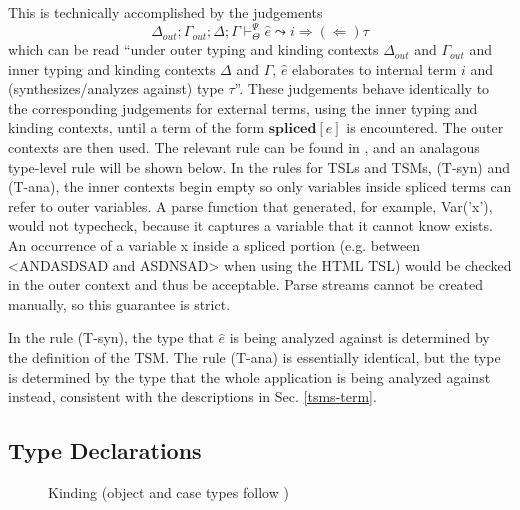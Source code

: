\documentclass{sig-alternate}[10pt]
\makeatletter
\newcommand\BeraMonottfamily{%
  \def\fvm@Scale{0.85}%
  \fontfamily{fvm}\selectfont%
}
\newcommand{\flyingbox}[1]{\fbox{{#1}}}
\newcommand{\mycaption}[1]{\vspace{-5px}\caption{#1}\vspace{-5px}}
\newcommand{\lstinlinew}[1]{{\scriptsize\BeraMonottfamily #1}}
\makeatother
\begin{document}
This is technically accomplished by the judgements \[\Delta_{out}; \Gamma_{out}; \Delta; \Gamma \vdash_{\Theta}^{\Psi} \hat{e} \leadsto i {\Rightarrow}{(\Leftarrow)} \tau\]  which can be read ``under outer typing and kinding contexts $\Delta_{out}$ and $\Gamma_{out}$ and inner typing and kinding contexts $\Delta$ and $\Gamma$,  $\hat{e}$ elaborates to internal term $i$ and (synthesizes/analyzes against) type $\tau$''. These judgements behave identically to the corresponding judgements for external terms, using the inner typing and kinding contexts, until a term of the form $\textbf{spliced}[e]$ is encountered. The outer contexts are then used. The relevant rule can be found in \cite{TSLs}, and an analagous type-level rule will be shown below. 
In the rules for TSLs and TSMs, (T-syn) and (T-ana), the inner contexts begin empty so only variables inside spliced terms can refer to outer variables. A \lstinlinew{parse} function that generated, for example, \lstinlinew{Var('x')}, would not typecheck, because it captures a variable that it cannot know exists. An occurrence of a variable \lstinlinew{x} inside a spliced portion (e.g. between \lstinlinew{<ANDASDSAD} and \lstinlinew{ASDNSAD>} when using the \lstinlinew{HTML} TSL) would be checked in the outer context and thus be acceptable. Parse streams cannot be created manually, so this guarantee is strict. %

In the rule (T-syn), the type that $\hat{e}$ is being analyzed against is determined by the definition of the TSM. The rule (T-ana) is essentially identical, but the type is determined by the type that the whole application is being analyzed against instead, consistent with the descriptions in Sec. \ref{tsms-term}. 


\subsection{Type Declarations}\label{declarations}




\begin{figure}[ht]
\flyingbox{$\Delta\vdash_{\Theta}\tau::\kappa$}
\begin{center}
\noLine
\BIC{}
\DP
\end{center}

\begin{center}
\noLine
\BIC{}
\DP
\end{center}
\mycaption{Kinding (object and case types follow \cite{TSLs})}
\label{kinding}
\end{figure}
\end{document}

